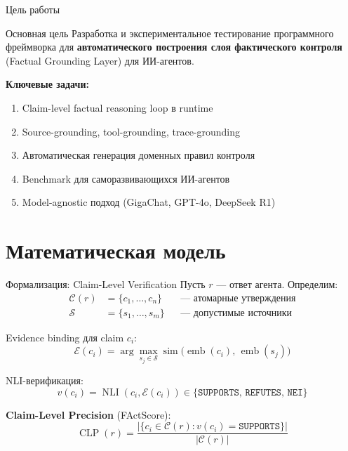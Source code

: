 \documentclass[aspectratio=169, 12pt]{beamer}
\begin{document}
\begin{frame}{Цель работы}
  \begin{block}{Основная цель}
    Разработка и экспериментальное тестирование программного фреймворка для \textbf{автоматического построения слоя фактического контроля} (Factual Grounding Layer) для ИИ-агентов.
  \end{block}
  \vspace{0.3cm}
  \textbf{Ключевые задачи:}
  \begin{enumerate}
    \item Claim-level factual reasoning loop в runtime
    \item Source-grounding, tool-grounding, trace-grounding
    \item Автоматическая генерация доменных правил контроля
    \item Benchmark для саморазвивающихся ИИ-агентов
    \item Model-agnostic подход (GigaChat, GPT-4o, DeepSeek R1)
  \end{enumerate}
\end{frame}

\section{Математическая модель}

\begin{frame}{Формализация: Claim-Level Verification}
  \small
  Пусть $r$ --- ответ агента. Определим:
  \vspace{-0.1cm}
  \begin{align}
    \mathcal{C}(r) &= \{c_1, \ldots, c_n\} && \text{--- атомарные утверждения} \\[2pt]
    \mathcal{S} &= \{s_1, \ldots, s_m\} && \text{--- допустимые источники}
  \end{align}
  \vspace{-0.3cm}

  Evidence binding для claim $c_i$:
  \vspace{-0.1cm}
  \[
    \mathcal{E}(c_i) = \arg\max_{s_j \in \mathcal{S}} \operatorname{sim}\bigl(\operatorname{emb}(c_i),\, \operatorname{emb}(s_j)\bigr)
  \]
  \vspace{-0.3cm}

  NLI-верификация:
  \vspace{-0.1cm}
  \[
    v(c_i) = \operatorname{NLI}(c_i, \mathcal{E}(c_i)) \in \{\texttt{SUPPORTS},\, \texttt{REFUTES},\, \texttt{NEI}\}
  \]
  \vspace{-0.3cm}

  \textbf{Claim-Level Precision} (FActScore):
  \[
    \boxed{\;\operatorname{CLP}(r) = \frac{\bigl|\{c_i \in \mathcal{C}(r) : v(c_i) = \texttt{SUPPORTS}\}\bigr|}{|\mathcal{C}(r)|}\;}
  \]
\end{frame}
\end{document}
